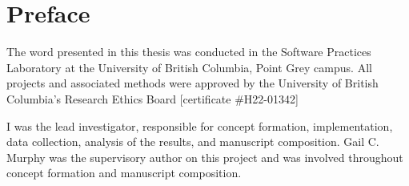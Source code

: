 
\chapter{Preface}

The word presented in this thesis was conducted in the Software Practices Laboratory at the University of British Columbia, Point Grey campus.
All projects and associated methods were approved by the University of British Columbia's Research Ethics Board [certificate \#H22-01342]

I was the lead investigator, responsible for concept formation, implementation, data collection, analysis of the results, and manuscript composition.
Gail C. Murphy was the supervisory author on this project and was involved throughout concept formation and manuscript composition.

\endinput

The Preface must include a statement indicating the student's contribution to the following:

\begin{itemize}
    \item Identification and design of the research program,
    \item Performance of the various parts of the research, and
    \item Analysis of the research data.
    \item Certain additional elements may also be required, as specified below.
\end{itemize}

